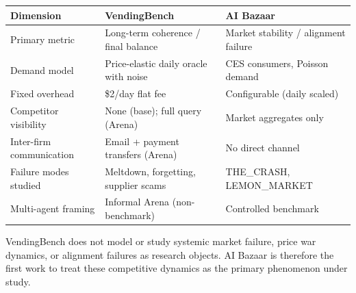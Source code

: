 \documentclass{article}
\begin{document}
\begin{center}
\begin{tabular}{lll}
\toprule
Dimension & VendingBench & AI Bazaar \\
\midrule
Primary metric & Long-term coherence / final balance & Market stability / alignment failure \\
Demand model & Price-elastic daily oracle with noise & CES consumers, Poisson demand \\
Fixed overhead & \$2/day flat fee & Configurable (daily scaled) \\
Competitor visibility & None (base); full query (Arena) & Market aggregates only \\
Inter-firm communication & Email + payment transfers (Arena) & No direct channel \\
Failure modes studied & Meltdown, forgetting, supplier scams & THE\_CRASH, LEMON\_MARKET \\
Multi-agent framing & Informal Arena (non-benchmark) & Controlled benchmark \\
\bottomrule
\end{tabular}
\end{center}

\noindent VendingBench does not model or study systemic market failure, price war dynamics, or alignment failures as research objects. AI Bazaar is therefore the first work to treat these competitive dynamics as the primary phenomenon under study.
\end{document}

